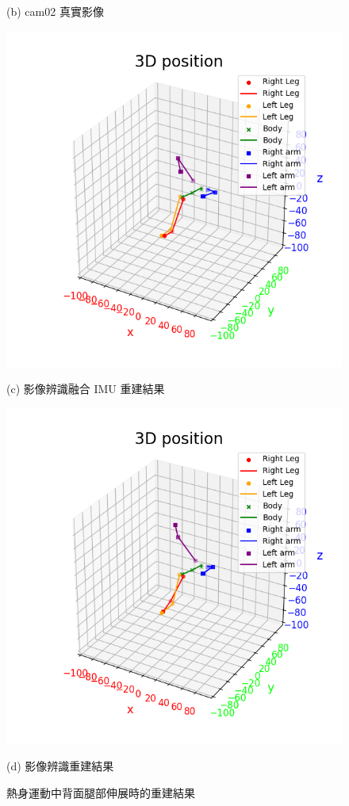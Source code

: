 \begin{figure}[!ht]
\begin{minipage}{.5\textwidth}
       \caption*{(b) cam02 真實影像}
    \end{minipage}
    \begin{minipage}{.5\textwidth}
       \centering
       \includegraphics[width=.95\linewidth]{figure/ch4_fig_warm_result_with4.png}
       \caption*{(c) 影像辨識融合 IMU 重建結果}
    \end{minipage}%
    \begin{minipage}{.5\textwidth}
       \centering
       \includegraphics[width=.95\linewidth]{figure/ch4_fig_warm_result_no4.png}
       \caption*{(d) 影像辨識重建結果}
    \end{minipage}
   \caption[熱身運動中背面腿部伸展時的重建結果]{熱身運動中背面腿部伸展時的重建結果}
   \label{ch4_fig_warm_back}
\end{figure}

